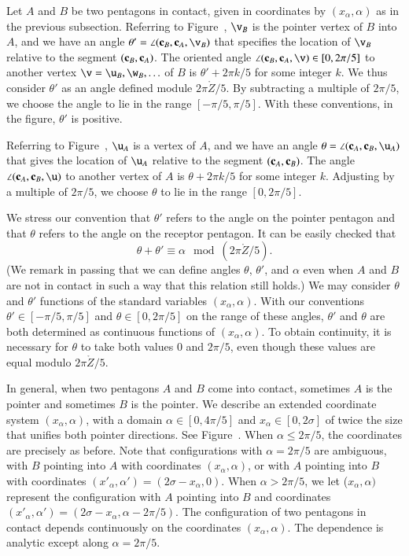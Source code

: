 Let $A$ and $B$ be two pentagons in contact, given in coordinates by
$(x_\alpha,\alpha)$ as in the previous subsection.  Referring to
Figure~, $\v_B$ is the pointer vertex of $B$ into $A$,
and we have an angle $\theta' = \angle(\c_B,\c_A,\v_B)$ that specifies
the location of $\v_B$ relative to the segment $({\mathbf c}_B,{\mathbf c}_A)$.  The
oriented angle $\angle(\c_B,\c_A,\v)\in[0,2\pi/5]$ to another vertex
$\v=\u_B,\w_B,\ldots$ of $B$ is $\theta' + 2\pi k/5$ for some integer
$k$.  We thus consider $\theta'$ as an angle defined module
$2\pi\ring{Z}/5$.  By subtracting a multiple of $2\pi/5$, we choose
the angle to lie in the range $[-\pi/5,\pi/5]$.  With these
conventions, in the figure, $\theta'$ is positive.

Referring to Figure~, $\u_A$ is a vertex of $A$, and we
have an angle $\theta = \angle(\c_A,\c_B,\u_A)$ that gives the
location of $\u_A$ relative to the segment $({\mathbf c}_A,{\mathbf c}_B)$.  The angle
$\angle(\c_A,\c_B,\u)$ to another vertex of $A$ is $\theta + 2\pi k/5$
for some integer $k$.  Adjusting by a multiple of $2\pi/5$, we choose
$\theta$ to lie in the range $[0,2\pi/5]$.

We stress our convention that $\theta'$ refers to the angle on the
pointer pentagon and that $\theta$ refers to the angle on the receptor
pentagon.  It can be easily checked that 
\begin{equation}
\theta+\theta' \equiv \alpha \mod (2\pi\ring{Z}/5).
\end{equation}
(We remark in passing that we can define angles $\theta$, $\theta'$,
and $\alpha$ even when $A$ and $B$ are not in contact in such a way
that this relation still holds.)  We may consider $\theta$ and
$\theta'$ functions of the standard variables $(x_\alpha,\alpha)$.  With
our conventions $\theta'\in [-\pi/5,\pi/5]$ and $\theta\in [0,2\pi/5]$
on the range of these angles, $\theta'$ and $\theta$ are both
determined as continuous functions of $(x_\alpha,\alpha)$.  To obtain
continuity, it is necessary for $\theta$ to take both values $0$ and
$2\pi/5$, even though these values are equal modulo $2\pi\ring{Z}/5$.

In general, when two pentagons $A$ and $B$ come into contact,
sometimes $A$ is the pointer and sometimes $B$ is the pointer.  We
describe an extended coordinate system $(x_\alpha,\alpha)$, with a
domain $\alpha\in[0,4\pi/5]$ and $x_\alpha\in[0,2\sigma]$ of twice the
size that unifies both pointer directions.  See
Figure~.  When $\alpha\le2\pi/5$, the coordinates are
precisely as before.  Note that configurations with $\alpha=2\pi/5$
are ambiguous, with $B$ pointing into $A$ with coordinates
$(x_\alpha,\alpha)$, or with $A$ pointing into $B$ with coordinates
$(x'_\alpha,\alpha')=(2\sigma - x_\alpha,0)$.  When $\alpha > 2\pi/5$, we
let ($x_\alpha,\alpha)$ represent the configuration with $A$ pointing
into $B$ and coordinates $(x'_\alpha,\alpha') =
(2\sigma-x_\alpha,\alpha-2\pi/5)$.  The configuration of two pentagons
in contact depends continuously on the coordinates $(x_\alpha,\alpha)$.
The dependence is analytic except along $\alpha=2\pi/5$.

